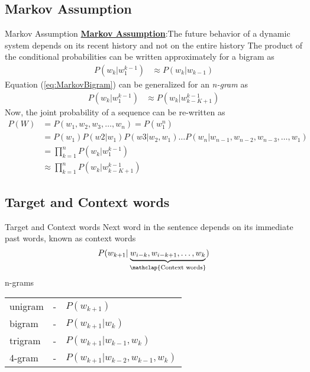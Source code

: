 \subsection{Markov Assumption}
\begin{frame}{Markov Assumption}
\textbf{\underline{Markov Assumption}}:The future behavior
of a dynamic system depends on its
recent history and not on the entire history
\linebreak
The product of the conditional probabilities can be written approximately for a bigram as
\begin{align}
P(w_k|w_1^{k-1}) &\approx P(w_k|w_{k-1}) \label{eq:MarkovBigram}
\end{align}
Equation (\ref{eq:MarkovBigram}) can be generalized for an \textit{n-gram} as
\begin{align}
P(w_k|w_1^{k-1}) &\approx P(w_k|w_{k-K+1}^{k-1}) \label{eq:MarkovNgram}
\end{align}
Now, the joint probability of a sequence can be re-written as
\begin{align}
P({W}) &= P(w_1,w_2,w_3,\ldots,w_n) = P(w_1^n)\\
&=P(w_1)P(w2|w_1)P(w3|w_2,w_1)\ldots P(w_n|w_{n-1},w_{n-2},w_{n-3},\ldots,w_1)\\
&=\prod_{k=1}^{n}P(w_k|w_1^{k-1}) \\
&\approx \prod_{k=1}^{n}P(w_k|w_{k-K+1}^{k-1})
\end{align}
\end{frame}

\subsection{Target and Context words}
\begin{frame}{Target and Context words}
Next word in the sentence depends on its immediate past words, known as context words
	\begin{equation}
		P(w_{k+1}|\underbrace{w_{i-k}, w_{i-k+1},\ldots,w_k}_{\mathclap{\text{Context words}}}) \nonumber
	\end{equation}
	n-grams

	\begin{tabular}{lll}
		unigram &- &$P(w_{k+1})$ \\
		bigram &- &$P(w_{k+1}|w_{k})$ \\
		trigram &- &$P(w_{k+1}|w_{k-1},w_k)$ \\
		4-gram &- &$P(w_{k+1}|w_{k-2},w_{k-1},w_k)$
	\end{tabular}

\end{frame}

